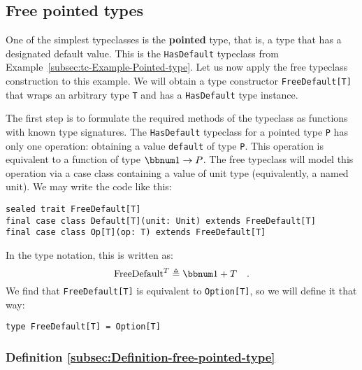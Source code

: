 \subsection{Free pointed types}

One of the simplest typeclasses is the \textbf{pointed}
type, that is, a type that has a designated default value. This is
the \lstinline!HasDefault!
typeclass from Example~\ref{subsec:tc-Example-Pointed-type}. Let
us now apply the free typeclass construction to this example. We will
obtain a type constructor \lstinline!FreeDefault[T]!
that wraps an arbitrary type \lstinline!T!
and has a \lstinline!HasDefault!
type instance.

The first step is to formulate the required methods of the typeclass
as functions with known type signatures. The \lstinline!HasDefault!
typeclass for a pointed type \lstinline!P!
has only one operation: obtaining a value \lstinline!default!
of type \lstinline!P!.
This operation is equivalent to a function of type $\bbnum 1\rightarrow P$.
The free typeclass will model this operation via a case class containing
a value of unit type (equivalently, a named unit). We may write the
code like this:
\begin{lstlisting}
sealed trait FreeDefault[T]
final case class Default[T](unit: Unit) extends FreeDefault[T]
final case class Op[T](op: T) extends FreeDefault[T]
\end{lstlisting}
In the type notation, this is written as:
\[
\text{FreeDefault}^{T}\triangleq\bbnum 1+T\quad.
\]
 We find that \lstinline!FreeDefault[T]!
is equivalent to \lstinline!Option[T]!,
so we will define it that way:
\begin{lstlisting}
type FreeDefault[T] = Option[T]
\end{lstlisting}

\subsubsection{Definition \label{subsec:Definition-free-pointed-type}\ref{subsec:Definition-free-pointed-type}}

